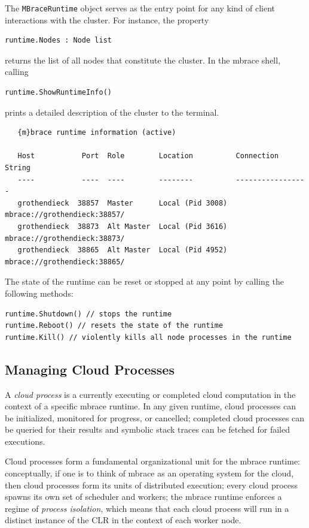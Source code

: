 \documentclass[9pt,a4paper]{article}
\newcommand{\mbrace}{mbrace}
\begin{document}
The \texttt{MBraceRuntime} object serves as the entry point for any kind of client interactions 
with the cluster. For instance, the property
\begin{lstlisting}
runtime.Nodes : Node list
\end{lstlisting}
returns the list of all nodes that constitute the cluster.
In the \mbrace{} shell, calling
\begin{lstlisting}
runtime.ShowRuntimeInfo()
\end{lstlisting}
prints a detailed description of the cluster to the terminal.
\begin{verbatim}
   {m}brace runtime information (active)                                               

   Host           Port  Role        Location          Connection String            
   ----           ----  ----        --------          -----------------            
   grothendieck  38857  Master      Local (Pid 3008)  mbrace://grothendieck:38857/ 
   grothendieck  38873  Alt Master  Local (Pid 3616)  mbrace://grothendieck:38873/ 
   grothendieck  38865  Alt Master  Local (Pid 4952)  mbrace://grothendieck:38865/ 
\end{verbatim}
The state of the runtime can be reset or stopped at any point by calling the following methods:
\begin{lstlisting}
runtime.Shutdown() // stops the runtime
runtime.Reboot() // resets the state of the runtime
runtime.Kill() // violently kills all node processes in the runtime
\end{lstlisting}

\subsection{Managing Cloud Processes}

A \emph{cloud process} is a currently executing or completed cloud computation in the context
of a specific \mbrace{} runtime. In any given runtime, cloud processes can be initialized,
monitored for progress, or cancelled; completed cloud processes can be queried for their results
and symbolic stack traces can be fetched for failed executions.

Cloud processes form a fundamental organizational unit for the \mbrace{} runtime:
conceptually, if one is to think of \mbrace{} as an operating system for the cloud,
then cloud processes form its units of distributed execution;
every cloud process spawns its own set of scheduler and workers;
the \mbrace{} runtime enforces a regime of \emph{process isolation},
which means that each cloud process will run in a distinct instance of the CLR in the context
of each worker node.
\end{document}
